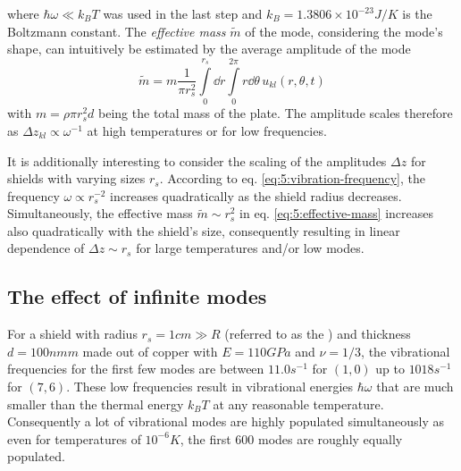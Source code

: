 where $\hbar\omega \ll k_B T$ was used in the last step and $k_B = 1.3806\times 10^{-23} \si{J/K}$ is the Boltzmann constant.
The \textit{effective mass} $\tilde{m}$ of the mode, considering the mode's shape, can intuitively be estimated by the average amplitude of the mode 
\begin{equation}\label{eq:5:effective-mass}
  \tilde{m} = m\frac{1}{\pi r_s^2}\int\limits_0^{r_s} \dd r \int\limits_0^{2\pi} r\dd\theta \, u_{kl}(r, \theta, t)
\end{equation}
with $m=\rho \pi r_s^2 d$ being the total mass of the plate.
The amplitude scales therefore as $\Delta z_{kl} \propto \omega^{-1}$ at high temperatures or for low frequencies.

It is additionally interesting to consider the scaling of the amplitudes $\Delta z$ for shields with varying sizes $r_s$.
According to eq. \eqref{eq:5:vibration-frequency}, the frequency $\omega\propto r_s^{-2}$ increases quadratically as the shield radius decreases.
Simultaneously, the effective mass $\tilde{m} \sim r_s^2$ in eq. \eqref{eq:5:effective-mass} increases also quadratically with the shield's size, consequently resulting in linear dependence of $\Delta z \sim r_s$ for large temperatures and/or low modes.




\subsection*{The effect of infinite modes}
For a shield with radius $r_s = 1\si{cm} \gg R$ (referred to as the ) and thickness $d=100\si{nmm}$ made out of copper with $E = 110\si{GPa}$ and $\nu = 1/3$, the vibrational frequencies for the first few modes are between $11.0\si{s^{-1}}$ for $(1,0)$ up to $1018\si{s^{-1}}$ for $(7,6)$.
These low frequencies result in vibrational energies $\hbar \omega$ that are much smaller than the thermal energy $k_B T$ at any reasonable temperature.
Consequently a lot of vibrational modes are highly populated simultaneously as even for temperatures of $10^{-6}\si{K}$, the first 600 modes are roughly equally populated.

